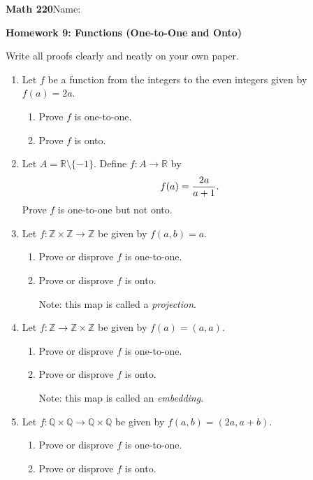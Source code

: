 \documentclass{article}
\begin{document}
{\bf Math 220}\hfill{Name:}

{\bf Homework 9: Functions (One-to-One and Onto)}
\vspace{.3in}

Write all proofs clearly and neatly on your own paper.

\begin{enumerate}

\item Let $f$ be a function from the integers to the even integers given by $f(a)=2a$.
\begin{enumerate}
\item Prove $f$ is one-to-one.
\item Prove $f$ is onto.
\end{enumerate}


\item Let $A={\mathbb R}\setminus\{-1\}$. Define $f:A\rightarrow {\mathbb R}$ by
\[f(a)={2a\over a+1}.\]
Prove $f$ is one-to-one but not onto.



\item Let $f:{\mathbb Z}\times{\mathbb Z}\rightarrow{\mathbb Z}$ be given by $f(a, b)=a$.
\begin{enumerate}
\item Prove or disprove $f$ is one-to-one.
\item Prove or disprove $f$ is onto.

Note: this map is called a {\it projection}.
\end{enumerate}

\item Let $f:{\mathbb Z}\rightarrow{\mathbb Z}\times{\mathbb Z}$ be given by $f(a) =(a, a)$.
\begin{enumerate}
\item Prove or disprove $f$ is one-to-one.
\item Prove or disprove $f$ is onto.

Note: this map is called an {\it embedding}.
\end{enumerate}

\item Let $f:{\mathbb Q}\times{\mathbb Q}\rightarrow{\mathbb Q}\times{\mathbb Q}$ be given by $f(a, b) =(2a, a+b)$.
\begin{enumerate}
\item Prove or disprove $f$ is one-to-one.
\item Prove or disprove $f$ is onto.

\end{enumerate}


\end{enumerate}
\end{document}
